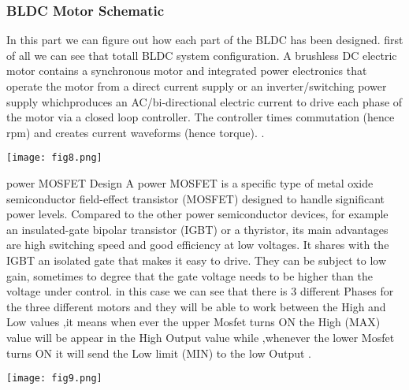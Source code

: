 \documentclass[11pt]{article}
\begin{document}
\subsubsection{BLDC Motor Schematic}
\label{BLDC Motor Schematic}
 In this part we can figure out how each part of the BLDC has been designed.\newline
first of all we can see that totall BLDC system configuration.\newline
A brushless DC electric motor contains a synchronous motor and integrated power electronics that operate the motor from a direct current supply or an inverter/switching power supply which\newline produces an AC/bi-directional electric current to drive each phase of the motor via a closed loop controller. The controller times commutation (hence rpm) and creates current waveforms (hence torque). .\newline

\begin {center}
\texttt{[image: fig8.png]}\newline
\end{center}
 power MOSFET Design
\newline
A power MOSFET is a specific type of metal oxide semiconductor field-effect transistor (MOSFET) designed to handle significant power levels.\newline
Compared to the other power semiconductor devices, for example an insulated-gate bipolar transistor (IGBT) or a thyristor, its main advantages are high switching speed and good efficiency at low voltages. It shares with the IGBT an isolated gate that makes it easy to drive. They can be subject to low gain, sometimes to degree that the gate voltage needs to be higher than the voltage under control.\newline
in this case we can see that there is 3 different Phases for the three different motors and they will be able to work between the High and Low values ,it means when ever the upper Mosfet turns ON the High (MAX) value will be appear in the High Output value while ,whenever the lower Mosfet turns ON it will send the Low limit (MIN) to the  low Output . 
\begin {center}
\texttt{[image: fig9.png]}\newline
\end{center}
\end{document}
